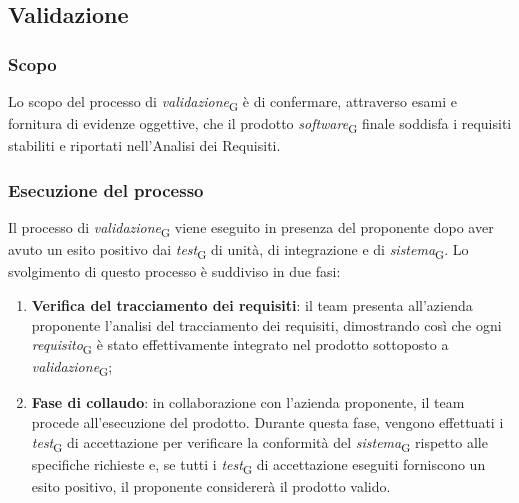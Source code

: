 \subsection{Validazione}
\subsubsection{Scopo}
Lo scopo del processo di \textit{validazione}\textsubscript{G} è di confermare, attraverso esami e fornitura di evidenze oggettive, che il prodotto \textit{software}\textsubscript{G} finale soddisfa i requisiti stabiliti e riportati nell'Analisi dei Requisiti. 

\subsubsection{Esecuzione del processo}
Il processo di \textit{validazione}\textsubscript{G} viene eseguito in presenza del proponente dopo aver avuto un esito positivo dai \textit{test}\textsubscript{G} di unità, di integrazione e di \textit{sistema}\textsubscript{G}. Lo svolgimento di questo processo è suddiviso in due fasi:
\begin{enumerate}
    \item \textbf{Verifica del tracciamento dei requisiti}: il team presenta all’azienda proponente l’analisi del tracciamento dei requisiti, dimostrando così che ogni \textit{requisito}\textsubscript{G} è stato effettivamente integrato nel prodotto sottoposto a \textit{validazione}\textsubscript{G};
    \item \textbf{Fase di collaudo}: in collaborazione con l’azienda proponente, il team procede all’esecuzione del prodotto. Durante questa fase, vengono effettuati i \textit{test}\textsubscript{G} di accettazione per verificare la conformità del \textit{sistema}\textsubscript{G} rispetto alle specifiche richieste e, se tutti i \textit{test}\textsubscript{G} di accettazione eseguiti forniscono un esito positivo, il proponente considererà il prodotto valido.
\end{enumerate}

